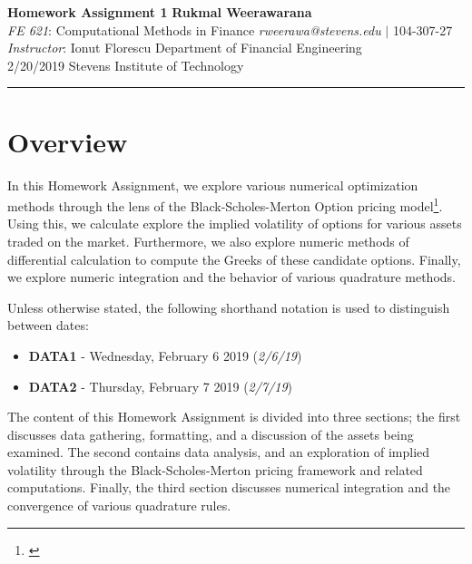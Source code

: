 \documentclass[10pt]{article}
\begin{document}
\thispagestyle{plain}


\noindent
\large\textbf{Homework Assignment 1} \hfill \textbf{Rukmal Weerawarana} \\
\normalsize \textit{FE 621}: Computational Methods in Finance \hfill \textit{rweerawa@stevens.edu} $\mid$ 104-307-27 \\
\textit{Instructor}: Ionut Florescu \hfill Department of Financial Engineering \\
2/20/2019 \hfill Stevens Institute of Technology

\noindent\rule{\linewidth}{.1em}



\section*{Overview}

In this Homework Assignment, we explore various numerical optimization methods through the lens of the Black-Scholes-Merton Option pricing model\footnote{\cite{Shreve2004}}. Using this, we calculate explore the implied volatility of options for various assets traded on the market. Furthermore, we also explore numeric methods of differential calculation to compute the Greeks of these candidate options. Finally, we explore numeric integration and the behavior of various quadrature methods.

Unless otherwise stated, the following shorthand notation is used to distinguish between dates:

\begin{itemize}
    \item \textbf{DATA1} - Wednesday, February 6 2019 (\textit{2/6/19})
    \item \textbf{DATA2} - Thursday, February 7 2019 (\textit{2/7/19})
\end{itemize}

The content of this Homework Assignment is divided into three sections; the first discusses data gathering, formatting, and a discussion of the assets being examined. The second contains data analysis, and an exploration of implied volatility through the Black-Scholes-Merton pricing framework and related computations. Finally, the third section discusses numerical integration and the convergence of various quadrature rules.
\end{document}
